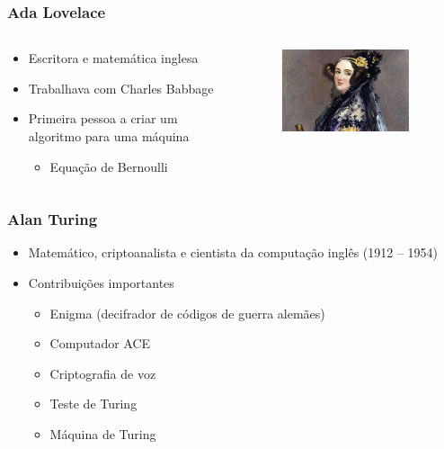 \documentclass[aspectratio=169,
				xcolor=table]{beamer}
\begin{document}
	\begin{frame}
		\frametitle{Ada Lovelace}
		\begin{columns}
			\begin{column}{0.6\textwidth}
				\begin{itemize}
					\item Escritora e matemática inglesa

					\item Trabalhava com Charles Babbage

					\item Primeira pessoa a criar um algoritmo para uma máquina 
					\begin{itemize}
						\item Equação de Bernoulli
					\end{itemize}
				\end{itemize}
			\end{column}
			\begin{column}{0.4\textwidth}
				\begin{figure}
					\centering
					\includegraphics[width=0.9\textwidth, keepaspectratio]{../figs/cap03/ada} 		
				\end{figure}
			\end{column}
		\end{columns}
	\end{frame}	
	
	\begin{frame}
		\frametitle{Alan Turing}
		\begin{itemize}
			\item Matemático, criptoanalista e cientista da computação inglês (1912 – 1954)
			\vspace{1em}
			\item Contribuições importantes
			\begin{itemize}
				\item Enigma (decifrador de códigos de guerra alemães)
				\item Computador ACE 
				\item Criptografia de voz
				\item Teste de Turing
				\item Máquina de Turing
			\end{itemize}
		\end{itemize}
	\end{frame}
	
\end{document}

